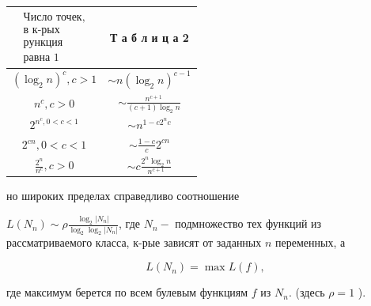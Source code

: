 \documentclass[10pt]{article}
\begin{document}
\begin{center}

\begin{tabular}{c|c}

\hline

$\begin{array}{c}\text { Число точек, } \\ \text { в к-рых } \\ \text { рункция } \\ \text { равна 1 }\end{array}$ & Т а б л и ц а 2 \\

\hline

$\left(\log _{2} n\right)^{c}, c>1$ & $\sim n\left(\log _{2} n\right)^{c-1}$ \\

\hline

$n^{c}, c>0$ & $\sim \frac{n^{c+1}}{(c+1) \log _{2} n}$ \\

\hline

$2^{n^{c}, 0<c<1}$ & $\sim n^{1-c 2^{n} c}$ \\

\hline

$2^{c n}, 0<c<1$ & $\sim \frac{1-c}{c} 2^{c n}$ \\

\hline

$\frac{2^{n}}{n^{c}}, c>0$ & $\sim c \frac{2^{n} \log _{2} n}{n^{c+1}}$ \\

\hline

\end{tabular}

\end{center}



но широких пределах справедливо соотношение



$L\left(N_{n}\right) \sim \rho \frac{\log _{2}\left|N_{n}\right|}{\log _{2} \log _{2}\left|N_{n}\right|}$, где $N_{n}-$ подмножество тех функций из рассматриваемого класса, к-рые зависят от заданных $n$ переменных, а



\[

L\left(N_{n}\right)=\max L(f),

\]



где максимум берется по всем булевым функциям $f$ из $N_{n}$. (здесь $\rho=1$ ).
\end{document}
